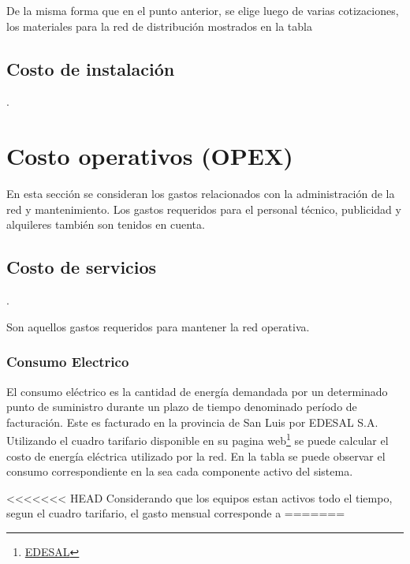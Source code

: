 \documentclass[11pt,a4paper]{article}
\begin{document}
De la misma forma que en el punto anterior, se elige luego de varias cotizaciones, los materiales para la red de distribución mostrados en la tabla 

\subsection{Costo de instalación}.



\section{Costo operativos (OPEX)}

En esta sección se consideran los gastos relacionados con la administración de la red y mantenimiento. Los gastos requeridos para el personal técnico, publicidad y alquileres también son tenidos en cuenta. 

\subsection{Costo de servicios}.

Son aquellos gastos requeridos para mantener la red operativa.

\subsubsection{Consumo Electrico}

El consumo eléctrico es la cantidad de energía demandada por un determinado punto de suministro durante un plazo de tiempo denominado período de facturación. Este es facturado en la provincia de San Luis por EDESAL S.A. Utilizando el cuadro tarifario disponible en su pagina web\footnote{\href{https://oficinavirtualedesal.com.ar/ove/html/simulacion.html}{EDESAL}} se puede calcular el costo de energía eléctrica utilizado por la red.
En la tabla se puede observar el consumo correspondiente en la sea cada componente activo del sistema.

<<<<<<< HEAD
Considerando que los equipos estan activos todo el tiempo, segun el cuadro tarifario, el gasto mensual corresponde a 
=======
\end{document}
